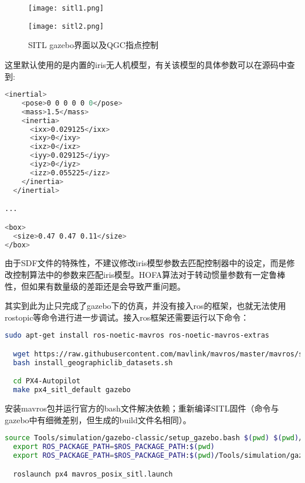 \begin{figure}[h]
  \centering
     \begin{minipage}[c]{0.45\textwidth}
      \centering
      \texttt{[image: sitl1.png]}
   \end{minipage}%
     \begin{minipage}[c]{0.45\textwidth}
      \centering
      \texttt{[image: sitl2.png]}
   \end{minipage}
   \caption{SITL gazebo界面以及QGC指点控制}
   \label{sitl}
 \end{figure}

 这里默认使用的是内置的iris无人机模型，有关该模型的具体参数可以在源码\cite{iris}中查到:
 \begin{lstlisting}[language=Bash, basicstyle=\footnotesize, linewidth=\linewidth]
  <inertial>
    <pose>0 0 0 0 0 0</pose>
    <mass>1.5</mass>
    <inertia>
      <ixx>0.029125</ixx>
      <ixy>0</ixy>
      <ixz>0</ixz>
      <iyy>0.029125</iyy>
      <iyz>0</iyz>
      <izz>0.055225</izz>
    </inertia>
  </inertial>

...

<box>
  <size>0.47 0.47 0.11</size>
</box>
 \end{lstlisting}
 
由于SDF文件的特殊性，不建议修改iris模型参数去匹配控制器中的设定，而是修改控制算法中的参数来匹配iris模型。HOFA算法对于转动惯量参数有一定鲁棒性，但如果有数量级的差距还是会导致严重问题。

其实到此为止只完成了gazebo下的仿真，并没有接入ros的框架，也就无法使用rostopic等命令进行进一步调试。接入ros框架还需要运行以下命令：

\begin{lstlisting}[language=Bash, basicstyle=\footnotesize, linewidth=\linewidth, breaklines=true]
  sudo apt-get install ros-noetic-mavros ros-noetic-mavros-extras

  wget https://raw.githubusercontent.com/mavlink/mavros/master/mavros/scripts/install_geographiclib_datasets.sh
  bash install_geographiclib_datasets.sh

  cd PX4-Autopilot
  make px4_sitl_default gazebo
\end{lstlisting}

安装mavros包并运行官方的bash文件解决依赖；重新编译SITL固件（命令与gazebo中有细微差别，但生成的build文件名相同）。

  \begin{lstlisting}[language=Bash, basicstyle=\footnotesize, linewidth=\linewidth, breaklines=true]
  source Tools/simulation/gazebo-classic/setup_gazebo.bash $(pwd) $(pwd)/build/px4_sitl_default
  export ROS_PACKAGE_PATH=$ROS_PACKAGE_PATH:$(pwd)
  export ROS_PACKAGE_PATH=$ROS_PACKAGE_PATH:$(pwd)/Tools/simulation/gazebo-classic/sitl_gazebo-classic

  roslaunch px4 mavros_posix_sitl.launch
\end{lstlisting}

